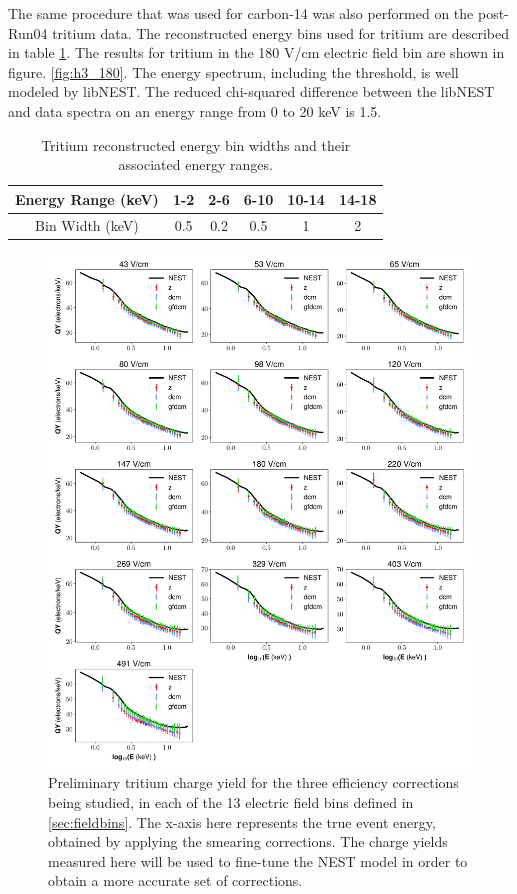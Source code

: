 The same procedure that was used for carbon-14 was also performed on the post-Run04 tritium data. The reconstructed energy bins used for tritium are described in table \ref{tab:ebins_h3}. The results for tritium in the 180 V/cm electric field bin are shown in figure. \ref{fig:h3_180}. The energy spectrum, including the threshold, is well modeled by libNEST. The reduced chi-squared difference between the libNEST and data spectra on an energy range from 0 to 20 keV is 1.5.

\begin{table}[h!]
\centering
    \begin{tabular}{ c || c | c | c | c | c  }
    \hline
    Energy Range (keV) & 1-2 & 2-6  & 6-10 & 10-14 & 14-18\\
    \hline
    Bin Width (keV)         &  0.5       & 0.2      &  0.5         & 1           & 2 \\
    \hline
    \end{tabular}
    \caption{Tritium reconstructed energy bin widths and their associated energy ranges.}
    \label{tab:ebins_h3}
\end{table}

\begin{figure}[h!]
\centering
\includegraphics[width=\textwidth]{Figures/H3_QY_prelim.pdf}
\caption{Preliminary tritium charge yield for the three efficiency corrections being studied, in each of the 13 electric field bins defined in \ref{sec:fieldbins}. The x-axis here represents the true event energy, obtained by applying the smearing corrections. The charge yields measured here will be used to fine-tune the NEST model in order to obtain a more accurate set of corrections.}
\label{fig:H3_QY_prelim}

\end{figure}

